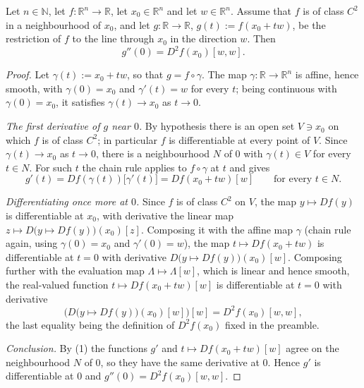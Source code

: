 \begin{lemma}
Let $n\in\mathbb{N}$, let $f:\mathbb{R}^n\to\mathbb{R}$, let $x_0\in\mathbb{R}^n$ and let
$w\in\mathbb{R}^n$. Assume that $f$ is of class $C^2$ in a neighbourhood of $x_0$, and let
$g:\mathbb{R}\to\mathbb{R}$, $g(t):=f(x_0+tw)$, be the restriction of $f$ to the line through
$x_0$ in the direction $w$. Then
$$g''(0)=D^2f(x_0)[w,w].$$
\end{lemma}
\begin{proof}
Let $\gamma(t):=x_0+tw$, so that $g=f\circ\gamma$. The map $\gamma:\mathbb{R}\to\mathbb{R}^n$ is
affine, hence smooth, with $\gamma(0)=x_0$ and $\gamma'(t)=w$ for every $t$; being continuous with
$\gamma(0)=x_0$, it satisfies $\gamma(t)\to x_0$ as $t\to0$.

\emph{The first derivative of $g$ near $0$.} By hypothesis there is an open set $V\ni x_0$ on which
$f$ is of class $C^2$; in particular $f$ is differentiable at every point of $V$. Since
$\gamma(t)\to x_0$ as $t\to0$, there is a neighbourhood $N$ of $0$ with $\gamma(t)\in V$ for every
$t\in N$. For such $t$ the chain rule applies to $f\circ\gamma$ at $t$ and gives
\begin{equation*}g'(t)=Df(\gamma(t))\big[\gamma'(t)\big]=Df(x_0+tw)[w]\qquad\text{for every }t\in N. \tag{1}\end{equation*}

\emph{Differentiating once more at $0$.} Since $f$ is of class $C^2$ on $V$, the map
$y\mapsto Df(y)$ is differentiable at $x_0$, with derivative the linear map
$z\mapsto D\big(y\mapsto Df(y)\big)(x_0)[z]$. Composing it with the affine map $\gamma$ (chain
rule again, using $\gamma(0)=x_0$ and $\gamma'(0)=w$), the map $t\mapsto Df(x_0+tw)$ is
differentiable at $t=0$ with derivative $D\big(y\mapsto Df(y)\big)(x_0)[w]$. Composing further
with the evaluation map $\Lambda\mapsto\Lambda[w]$, which is linear and hence smooth, the
real-valued function $t\mapsto Df(x_0+tw)[w]$ is differentiable at $t=0$ with derivative
$$\Big(D\big(y\mapsto Df(y)\big)(x_0)[w]\Big)[w]=D^2f(x_0)[w,w],$$
the last equality being the definition of $D^2f(x_0)$ fixed in the preamble.

\emph{Conclusion.} By (1) the functions $g'$ and $t\mapsto Df(x_0+tw)[w]$ agree on the
neighbourhood $N$ of $0$, so they have the same derivative at $0$. Hence $g'$ is differentiable at
$0$ and $g''(0)=D^2f(x_0)[w,w]$.
\end{proof}
